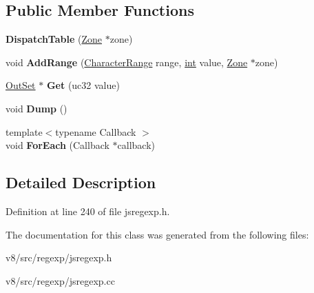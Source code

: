 \subsection*{Public Member Functions}
\begin{DoxyCompactItemize}
\item 
\mbox{\label{classv8_1_1internal_1_1DispatchTable_af4b64bc044ec5e385de4b27324604264}} 
{\bfseries Dispatch\+Table} (\mbox{\hyperlink{classv8_1_1internal_1_1Zone}{Zone}} $\ast$zone)
\item 
\mbox{\label{classv8_1_1internal_1_1DispatchTable_a09e154202a1c257ae7a020333366c211}} 
void {\bfseries Add\+Range} (\mbox{\hyperlink{classv8_1_1internal_1_1CharacterRange}{Character\+Range}} range, \mbox{\hyperlink{classint}{int}} value, \mbox{\hyperlink{classv8_1_1internal_1_1Zone}{Zone}} $\ast$zone)
\item 
\mbox{\label{classv8_1_1internal_1_1DispatchTable_a9c1164d1cf0666c48f59e151e5c36b0f}} 
\mbox{\hyperlink{classv8_1_1internal_1_1OutSet}{Out\+Set}} $\ast$ {\bfseries Get} (uc32 value)
\item 
\mbox{\label{classv8_1_1internal_1_1DispatchTable_ae34f706102818431e69470a710ce64c4}} 
void {\bfseries Dump} ()
\item 
\mbox{\label{classv8_1_1internal_1_1DispatchTable_a600e5582b3e05d456c423454d61b0eba}} 
{\footnotesize template$<$typename Callback $>$ }\\void {\bfseries For\+Each} (Callback $\ast$callback)
\end{DoxyCompactItemize}


\subsection{Detailed Description}


Definition at line 240 of file jsregexp.\+h.



The documentation for this class was generated from the following files\+:\begin{DoxyCompactItemize}
\item 
v8/src/regexp/jsregexp.\+h\item 
v8/src/regexp/jsregexp.\+cc\end{DoxyCompactItemize}
